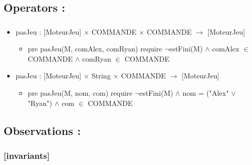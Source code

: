 \documentclass[11pt]{article}
\begin{document}
\subsection{Operators :}
\label{sec-1.6}

\subsubsection{}

\begin{itemize}

\item pasJeu : [MoteurJeu] $\times$ COMMANDE $\times$ COMMANDE $\to$ [MoteurJeu]\\
\label{sec-1.6.1.1}

\begin{itemize}

\item pre pasJeu(M, comAlex, comRyan) require $\neg$estFini(M) $\wedge$ comAlex $\in$ COMMANDE $\wedge$ comRyan $\in$ COMMANDE\\
\label{sec-1.6.1.1.1}


\end{itemize} %

\item pasJeu : [MoteurJeu] $\times$ String $\times$ COMMANDE $\to$ [MoteurJeu]\\
\label{sec-1.6.1.2}

\begin{itemize}

\item pre pasJeu(M, nom, com) require $\neg$estFini(M) $\wedge$ nom = ("Alex" $\vee$ "Ryan") $\wedge$ com $\in$ COMMANDE\\
\label{sec-1.6.1.2.1}





\end{itemize} %
\end{itemize} %
\subsection{Observations :}
\label{sec-1.7}

\subsubsection{[invariants]}
\label{sec-1.7.1}
\end{document}
